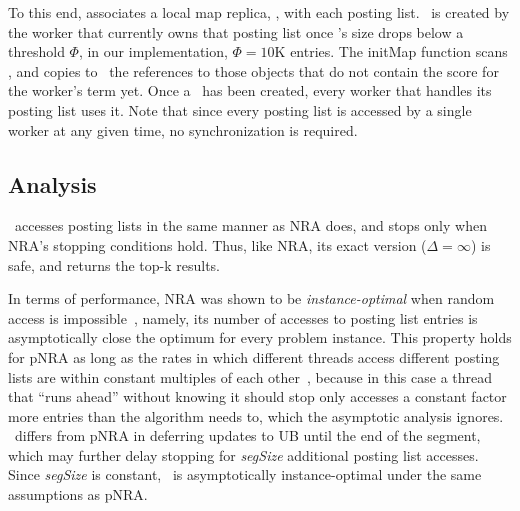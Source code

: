To this end, \alg\/ associates a local map replica, \TMap, with each posting list. \TMap\ is created by the worker that currently owns that posting list once \DMap's size drops below a threshold $\Phi$,
in our implementation, $\Phi=10$K entries. The {\sc initMap} function scans \DMap, and copies to \TMap\ the references to those \Docobj{} objects that do not contain the score for the worker's term yet.  Once a \TMap\ has been created, every worker that handles its posting list uses it.
Note that since every posting list is accessed by a single worker at any given time, no synchronization is required.
%

\subsection{Analysis}

\alg\ accesses posting lists in the same manner as NRA does, and stops only when NRA's stopping conditions hold. Thus, like NRA, its 
exact version ($\Delta = \infty$) is safe, and returns the top-k results. 

In terms of performance, NRA was shown to be \emph{instance-optimal} when  random access is impossible~\cite{Fagin:2001}, 
namely, its number of accesses to posting list entries is asymptotically close the optimum for every problem instance.  
This property holds for pNRA as long as the rates in which different threads access different posting lists are within constant multiples of each other~\cite{Fagin:2001}, because in this case a thread that ``runs ahead'' without knowing it should stop only accesses a constant factor more entries than the algorithm needs to, which the asymptotic
analysis ignores. \alg\ differs from pNRA in deferring updates to UB until the end of the segment, 
which may further delay stopping for \emph{segSize} additional posting list accesses. Since \emph{segSize} is constant, \alg\ is asymptotically
instance-optimal under the same assumptions as pNRA.


